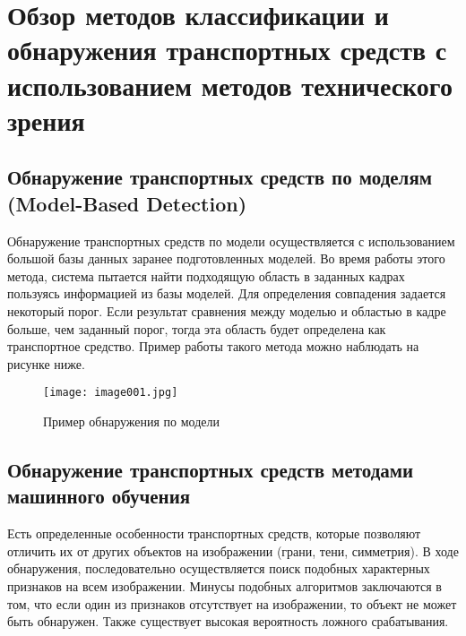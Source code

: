 \chapter{Обзор методов классификации и обнаружения транспортных средств с использованием методов технического зрения}

\section{Обнаружение транспортных средств по моделям (Model-Based Detection)}

Обнаружение транспортных средств по модели осуществляется с использованием большой базы данных заранее подготовленных моделей. Во время работы этого метода, система пытается найти подходящую область в заданных кадрах пользуясь информацией из базы моделей. Для определения совпадения задается некоторый порог. Если результат сравнения между моделью и областью в кадре больше, чем заданный порог, тогда эта область будет определена как транспортное средство. Пример работы такого метода можно наблюдать на рисунке ниже.

\begin{figure}[htbp]
\centering
\texttt{[image: image001.jpg]}
\caption{Пример обнаружения по модели~\cite{one}}%
\label{fig:how-to-do-research}
\end{figure}

\section{Обнаружение транспортных средств методами машинного обучения}

Есть определенные особенности транспортных средств, которые позволяют отличить их от других объектов на изображении (грани, тени, симметрия). В ходе обнаружения, последовательно осуществляется поиск подобных характерных признаков на всем изображении. Минусы подобных алгоритмов заключаются в том, что если один из признаков отсутствует на изображении, то объект не может быть обнаружен. Также существует высокая вероятность ложного срабатывания.

